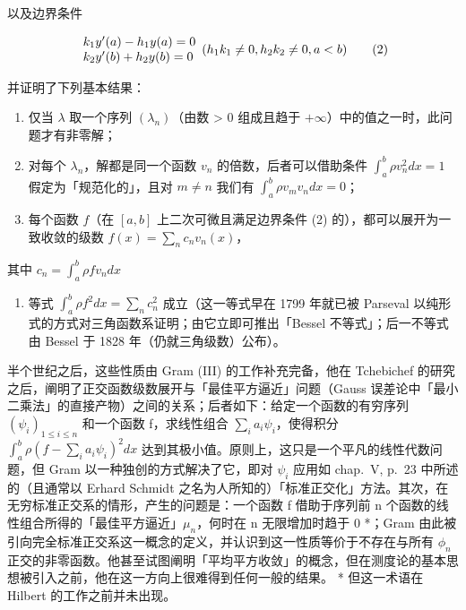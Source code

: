 以及边界条件

\[
\begin{array}{l l} k _ {1} y ^ {\prime} (a) - h _ {1} y (a) = 0 \\ k _ {2} y ^ {\prime} (b) + h _ {2} y (b) = 0 \end{array} (h _ {1} k _ {1} \neq 0, h _ {2} k _ {2} \neq 0, a <   b)\tag{2}
\]

并证明了下列基本结果：

\begin{enumerate}
\def\labelenumi{\arabic{enumi})}
\item
  仅当 \(\lambda\) 取一个序列 \((\lambda_{n})\)（由数 > 0 组成且趋于 \(+\infty\)）中的值之一时，此问题才有非零解；
\item
  对每个 \(\lambda_{n}\)，解都是同一个函数 \(v_{n}\) 的倍数，后者可以借助条件 \(\int_{a}^{b} \rho v_{n}^{2} dx = 1\) 假定为「规范化的」，且对 \(m \neq n\) 我们有 \(\int_{a}^{b} \rho v_{m} v_{n} dx = 0\)；
\item
  每个函数 \(f\)（在 \([a, b]\) 上二次可微且满足边界条件 (2) 的），都可以展开为一致收敛的级数 \(f(x) = \sum_{n} c_{n} v_{n}(x)\)，
\end{enumerate}

其中 \(c_{n} = \int_{a}^{b}\rho fv_{n}dx\)

\begin{enumerate}
\def\labelenumi{\arabic{enumi})}
\setcounter{enumi}{3}
\tightlist
\item
  等式 \(\int_{a}^{b}\rho f^2 dx = \sum_n c_n^2\) 成立（这一等式早在 1799 年就已被 Parseval 以纯形式的方式对三角函数系证明；由它立即可推出「Bessel 不等式」；后一不等式由 Bessel 于 1828 年（仍就三角级数）公布）。
\end{enumerate}

半个世纪之后，这些性质由 Gram (III) 的工作补充完备，他在 Tchebichef 的研究之后，阐明了正交函数级数展开与「最佳平方逼近」问题（Gauss 误差论中「最小二乘法」的直接产物）之间的关系；后者如下：给定一个函数的有穷序列 \((\psi_{i})_{1\leqslant i\leqslant n}\) 和一个函数 f，求线性组合 \(\sum_{i}a_{i}\psi_{i}\)，使得积分 \(\int_{a}^{b}\rho (f - \sum_{i}a_{i}\psi_{i})^{2}dx\) 达到其极小值。原则上，这只是一个平凡的线性代数问题，但 Gram 以一种独创的方式解决了它，即对 \(\psi_{i}\) 应用如 chap.~V, p.~23 中所述的（且通常以 Erhard Schmidt 之名为人所知的）「标准正交化」方法。其次，在无穷标准正交系的情形，产生的问题是：一个函数 f 借助于序列前 n 个函数的线性组合所得的「最佳平方逼近」\(\mu_{n}\)，何时在 n 无限增加时趋于 0 *；Gram 由此被引向完全标准正交系这一概念的定义，并认识到这一性质等价于不存在与所有 \(\phi_{n}\) 正交的非零函数。他甚至试图阐明「平均平方收敛」的概念，但在测度论的基本思想被引入之前，他在这一方向上很难得到任何一般的结果。
* 但这一术语在 Hilbert 的工作之前并未出现。


